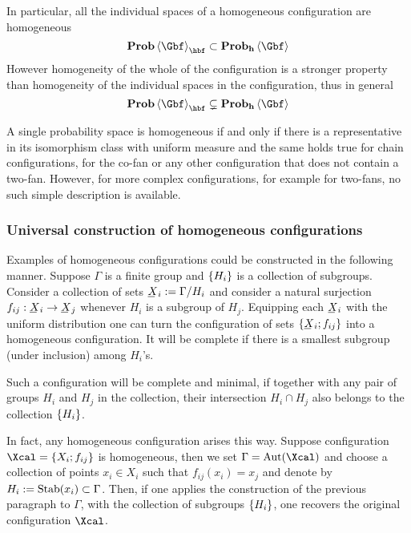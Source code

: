   In particular, all the individual spaces of a homogeneous
  configuration are homogeneous 
  \[
    \prob\<\Gbf>_{\hbf}\subset\probhom\<\Gbf>
  \]
  However homogeneity of the whole of the configuration is a stronger
  property than homogeneity of the individual spaces in the
  configuration, thus in general
  \[
    \prob\<\Gbf>_{\hbf}
    \subsetneq
    \probhom\<\Gbf>
  \]

  A single probability space is homogeneous if and only if there is a
  representative in its isomorphism class with uniform measure and the
  same holds true for chain configurations, for the co-fan or any
  other configuration that does not contain a two-fan.  However, for
  more complex configurations, for example for two-fans, no such
  simple description is available.
 
 \subsubsection{Universal construction of homogeneous configurations} 
  Examples of homogeneous configurations could be constructed in the
  following manner.  Suppose $\Gamma$ is a finite group and
  $\left\{H_{i}\right\}$ is a collection of subgroups. Consider a collection of
  sets $\un X_{i}:=\Gamma/H_{i}$ and consider a natural surjection
  $f_{ij}:\un X_{i}\to \un X_{j}$ whenever $H_{i}$ is a subgroup of
  $H_{j}$. Equipping each $\un X_{i}$ with the uniform distribution
  one can turn the configuration of sets $\set{\un X_{i};f_{ij}}$ into
  a homogeneous configuration. It will be complete if there is a
  smallest subgroup (under inclusion) among $H_{i}$'s.  
  
  Such a configuration will be complete and minimal, if
  together with any pair of groups $H_{i}$ and $H_{j}$ in the
  collection, their intersection $H_{i}\cap H_{j}$ also belongs to the
  collection $\left\{H_{i}\right\}$.

  In fact, any homogeneous configuration arises this way.  Suppose
  configuration $\Xcal = \set{ X_i ; f_{ij} }$ is homogeneous, then
  we set $\Gamma = \Aut(\Xcal)$ and choose a collection of points $x_i
  \in X_i$ such that $f_{ij} (x_i) = x_j$ and denote by $H_i :=
  \operatorname{\mathrm{Stab}}(x_i) \subset \Gamma$.  Then, if one applies the construction
  of the previous paragraph to $\Gamma$, with the collection of
  subgroups $\left\{H_i\right\}$, one recovers the original configuration
  $\Xcal$.

